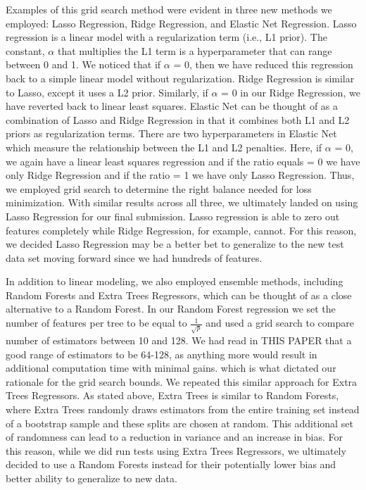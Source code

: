 \documentclass[11pt, oneside]{article}   	%
\begin{document}
Examples of this grid search method were evident in three new methods we employed: Lasso Regression, Ridge Regression, and Elastic Net Regression. Lasso regression is a linear model with a regularization term (i.e., L1 prior). The constant, $\alpha$ that multiplies the L1 term is a hyperparameter that can range between 0 and 1. We noticed that if $\alpha$ = 0, then we have reduced this regression back to a simple linear model without regularization. Ridge Regression is similar to Lasso, except it uses a L2 prior. Similarly, if $\alpha$ = 0 in our Ridge Regression, we have reverted back to linear least squares. Elastic Net can be thought of as a combination of Lasso and Ridge Regression in that it combines both L1 and L2 priors as regularization terms. There are two hyperparameters in Elastic Net which measure the relationship between the L1 and L2 penalties. Here, if $\alpha$ = 0, we again have a linear least squares regression and if the ratio equals = 0 we have only Ridge Regression and if the ratio = 1 we have only Lasso Regression. Thus, we employed grid search to determine the right balance needed for loss minimization. With similar results across all three, we ultimately landed on using Lasso Regression for our final submission. Lasso regression is able to zero out features completely while Ridge Regression, for example, cannot. For this reason, we decided Lasso Regression may be a better bet to generalize to the new test data set moving forward since we had hundreds of features. 

In addition to linear modeling, we also employed ensemble methods, including Random Forests and Extra Trees Regressors, which can be thought of as a close alternative to a Random Forest. In our Random Forest regression we set the number of features per tree to be equal to $\frac{1}{\sqrt{p}}$ and used a grid search to compare number of estimators between 10 and 128. We had read in THIS PAPER that a good range of estimators to be 64-128, as anything more would result in additional computation time with minimal gains. which is what dictated our rationale for the grid search bounds. We repeated this similar approach for Extra Trees Regressors. As stated above, Extra Trees is similar to Random Forests, where Extra Trees randomly draws estimators from the entire training set instead of a bootstrap sample and these splits are chosen at random. This additional set of randomness can lead to a reduction in variance and an increase in bias. For this reason, while we did run tests using Extra Trees Regressors, we ultimately decided to use a Random Forests instead for their potentially lower bias and better ability to generalize to new data. 
\end{document}

